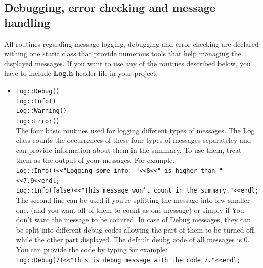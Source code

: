 \documentclass[]{Photos_interface_design}
\begin{document}
\subsection{Debugging, error checking and message handling}

All routines regarding message logging, debugging and error checking are declared withing one static class that provide numerous tools that help managing the displayed messages. If you want to use any of the routines described below, you have to include \textbf{Log.h} header file in your project.
\begin{itemize}
 \item {\tt Log::Debug()} \hfill \\
       {\tt Log::Info()} \hfill \\
       {\tt Log::Warning()} \hfill \\
       {\tt Log::Error()} \hfill \\
The four basic routines used for logging different types of messages. The Log class counts the occurrences of these four types of messages separateley and can provide information about them in the summary. To use them, treat them as the output of your messages. For example: \\
{\tt Log::Info()<<"Logging some info: "<<8<<" is higher than "<<7.9<<endl; } \\
{\tt Log::Info(false)<<"This message won't count in the summary."<<endl; } \\
The second line can be used if you're splitting the message into few smaller one, (and you want all of them to count as one message) or simply if You don't want the message to be counted. In case of Debug messages, they can be split into different debug codes allowing the part of them to be turned off, while the other part displayed. The default deubg code of all messages is 0. You can provide the code by typing for example: \\
{\tt Log::Debug(7)<<"This is debug message with the code 7."<<endl; }


\end{itemize}
\end{document}

